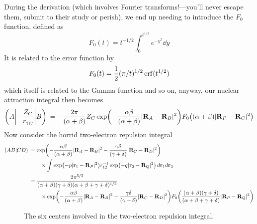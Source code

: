 \documentclass[11pt]{article}
\begin{document}
During the derivation (which involves Fourier transforms!---you'll never escape them, submit to their study or perish), we end up needing to introduce the $F_0$ function, defined as
\begin{equation}\label{key}
F_0 (t) = t^{-1/2} \int_0^{t^{1/2}} e^{-y^2}\dd{y} 
\end{equation}
It is related to the error function by 
\begin{equation}\label{key}
F_0 (t) = \frac{1}{2} (\pi/t)^{1/2} \erf(t^{1/2}) 
\end{equation}
which itself is related to the Gamma function and so on, anyway, our nuclear attraction integral then becomes
\begin{equation}\label{key}
\left(A \middle| -\frac{Z_C}{r_{1C}^{
}} \middle| B \right)\: = -\frac{2\pi}{(\alpha + \beta)} Z_C \exp(-\frac{\alpha \beta}{(\alpha + \beta)}|\textbf{R}_A - \textbf{R}_B|^2) F_0\qty((\alpha + \beta)|\textbf{R}_P - \textbf{R}_C|^2)
\end{equation}
Now consider the horrid two-electron repulsion integral 
\begin{align*}
\left(AB\middle|CD\right)\: &= \exp(-\frac{\alpha\beta}{(\alpha + \beta)} |\textbf{R}_A - \textbf{R}_B|^2 - \frac{\gamma \delta}{(\gamma + \delta)} |\textbf{R}_C - \textbf{R}_D|^2 ) \\
&\qquad \times \int \exp(-p|\textbf{r}_1 - \textbf{R}_P|^2) r_{12}^{-1} \exp(-q |\textbf{r}_2 - \textbf{R}_Q|^2) \dd{\textbf{r}_1 d\textbf{r}_2} \\
 &= \frac{2\pi^{5/2}}{(\alpha + \beta)(\gamma + \delta)(\alpha + \beta + \gamma + \delta)^{1/2}}\\
 &\qquad \times \exp(-\frac{\alpha\beta}{(\alpha + \beta)} |\textbf{R}_A - \textbf{R}_B|^2 - \frac{\gamma \delta}{(\gamma + \delta)} |\textbf{R}_C - \textbf{R}_D|^2) F_0 \qty(\frac{(\alpha + \beta)(\gamma + \delta)}{(\alpha + \beta + \gamma + \delta)} |\textbf{R}_P - \textbf{R}_Q|^2)
\end{align*}

\begin{figure}[H]
	\centering
	\caption{The six centers involved in the two-electron repulsion integral. }
\end{figure}
\end{document}
